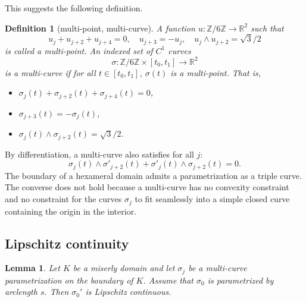 \documentclass[11pt]{amsart}
\newtheorem{definition}[equation]{Definition}
\newtheorem{lemma}[equation]{Lemma}
\newcommand{\ring}[1]{\mathbb{#1}}
\def\rZ{{\ring{Z}}}
\begin{document}
This suggests the following definition.

\begin{definition}[multi-point, multi-curve]
A function $u:\rZ/6\rZ\to\ring{R}^2$ such that 
  \begin{equation}\label{eqn:uA}
  u_j+u_{j+2}+u_{j+4} = 0,\quad u_{j+3} = -u_j,\quad  {u_j}\land{u_{j+2}}=\sqrt{3}/2
  \end{equation}
is called a {\it multi-point}. 
An indexed set of $C^1$ curves
\[
\sigma:\ring{Z}/6\ring{Z} \times [t_0,t_1]\to \ring{R}^2
\]
is a {\it  multi-curve} if for all $t\in[t_0,t_1]$, $\sigma(t)$ is a multi-point.
That is,
\begin{itemize}
\item $\sigma_j(t) + \sigma_{j+2}(t) + \sigma_{j+4}(t) = 0$,
\item $\sigma_{j+3}(t) = -\sigma_j(t)$,
\item ${\sigma_j(t)}\land{\sigma_{j+2}(t)}=\sqrt{3}/2$.
\end{itemize}
\end{definition}



By differentiation, a multi-curve also satisfies for all $j$:
\begin{equation}\label{eqn:sigma'}
{\sigma_j(t)}\land{\sigma'_{j+2}(t)} 
+ {\sigma'_j(t)}\land{\sigma_{j+2}(t)} = 0.
\end{equation}
The boundary of a hexameral domain admits a parametrization as a
triple curve.  The converse does not hold because a multi-curve has no
convexity constraint and no constraint for the curves $\sigma_j$ to
fit seamlessly into a simple closed curve containing the origin in the
interior.


\subsection{Lipschitz continuity}

\begin{lemma}\label{lemma:s0:lip}
  Let $K$ be a miserly domain and let $\sigma_j$ be a multi-curve
  parametrization on the boundary of $K$.  Assume that $\sigma_0$ is
  parametrized by arclength $s$.  Then $\sigma_0'$ is Lipschitz
  continuous.
\end{lemma}
\end{document}
